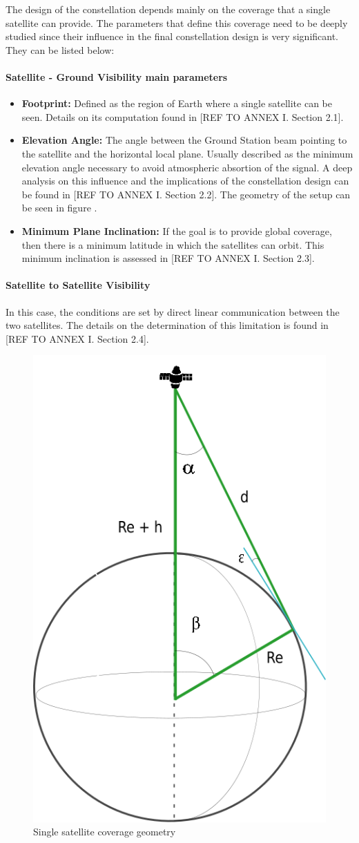 The design of the constellation depends mainly on the coverage that a single satellite can provide. The parameters that define this coverage need to be deeply studied since their influence in the final constellation design is very significant. They can be listed below:

\paragraph{Satellite - Ground Visibility main parameters}
\begin{itemize}
\item \textbf{Footprint:} Defined as the region of Earth where a single satellite can
be seen. Details on its computation found in [{REF TO ANNEX I. Section 2.1}]. 
\item \textbf{Elevation Angle:} The angle between the Ground Station beam pointing to the satellite and the horizontal local plane. Usually described as the minimum elevation angle necessary to avoid atmospheric absortion of the signal. A deep analysis on this influence and the implications of the constellation design can be found in [{REF TO ANNEX I. Section 2.2}]. The geometry of the setup can be seen in figure \cite{fig:AngleSSatFoot}.
\item \textbf{Minimum Plane Inclination: } If the goal is to provide global coverage, then there is a minimum latitude in which the satellites can orbit. This minimum inclination is assessed in [{REF TO ANNEX I. Section 2.3}].
\end{itemize}

\paragraph{Satellite to Satellite Visibility\\}
In this case, the conditions are set by direct linear communication between the two satellites. The details on the determination of this limitation is found in [{REF TO ANNEX I. Section 2.4}].

\begin{figure}[H] %
	\centering
	\includegraphics[width=.3\textwidth]{./fig-Ch2-OrbitalCoverage/AngleSSatFoot.png}
	\caption{Single satellite coverage geometry}
	\label{fig:AngleSSatFoot}
	
\end{figure}